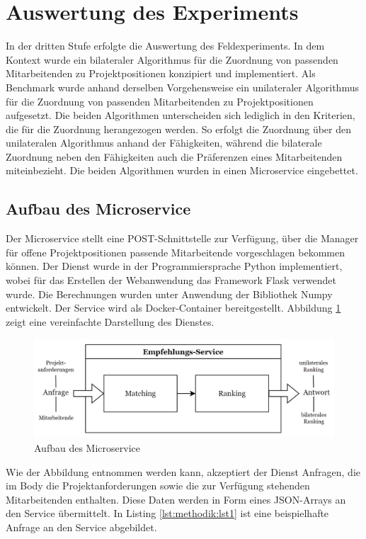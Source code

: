 \section{Auswertung des Experiments}
In der dritten Stufe erfolgte die Auswertung des Feldexperiments.
In dem Kontext wurde ein bilateraler Algorithmus für die Zuordnung von passenden Mitarbeitenden zu Projektpositionen konzipiert und implementiert.
Als Benchmark wurde anhand derselben Vorgehensweise ein unilateraler Algorithmus für die Zuordnung von passenden Mitarbeitenden zu Projektpositionen aufgesetzt.
Die beiden Algorithmen unterscheiden sich lediglich in den Kriterien, die für die Zuordnung herangezogen werden.
So erfolgt die Zuordnung über den unilateralen Algorithmus anhand der Fähigkeiten, während die bilaterale Zuordnung neben den Fähigkeiten auch die Präferenzen eines Mitarbeitenden miteinbezieht.
Die beiden Algorithmen wurden in einen Microservice eingebettet.

\subsection{Aufbau des Microservice}
Der Microservice stellt eine POST-Schnittstelle zur Verfügung, über die Manager für offene Projektpositionen passende Mitarbeitende vorgeschlagen bekommen können.
Der Dienst wurde in der Programmiersprache Python implementiert, wobei für das Erstellen der Webanwendung das Framework Flask verwendet wurde.
Die Berechnungen wurden unter Anwendung der Bibliothek Numpy entwickelt.
Der Service wird als Docker-Container bereitgestellt.
Abbildung \ref{fig:methodik:abb8} zeigt eine vereinfachte Darstellung des Dienstes.

\begin{figure}[H]
    \centering
	\includegraphics[width=1.0\textwidth]{gfx/empfehlungsservice.png}
	\caption[Aufbau des Microservice]{Aufbau des Microservice}
	\label{fig:methodik:abb8}
\end{figure}

Wie der Abbildung entnommen werden kann, akzeptiert der Dienst Anfragen, die im Body die Projektanforderungen sowie die zur Verfügung stehenden Mitarbeitenden enthalten.
Diese Daten werden in Form eines JSON-Arrays an den Service übermittelt.
In Listing \ref{lst:methodik:lst1} ist eine beispielhafte Anfrage an den Service abgebildet.

